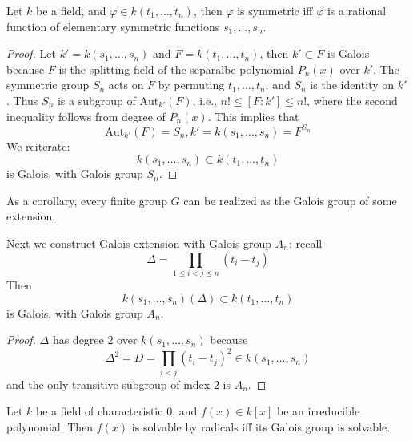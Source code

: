 \documentclass[openany]{book}
\newcommand{\aut}{\text{Aut}}
\begin{document}
\begin{prop}
    Let $k$ be a field, and $\varphi\in k(t_1,\dots,t_n)$, then $\varphi$ is symmetric iff $\varphi$ is a rational function of elementary symmetric functions $s_1,\dots, s_n$.
\end{prop}
\begin{proof}
    Let $k'=k(s_1,\dots, s_n)$ and $F=k(t_1,\dots, t_n)$, then $k'\subset F$ is Galois because $F$ is the splitting field of the separalbe polynomial $P_n(x)$ over $k'$. The symmetric group $S_n$ acts on $F$ by permuting $t_1,\dots, t_n$, and $S_n$ is the identity on $k'$. Thus $S_n$ is a subgroup of $\aut_{k'}(F)$, i.e., $n!\leq [F:k']\leq n!$, where the second inequality follows from degree of $P_n(x)$. This implies that 
    \begin{equation*}
        \aut_{k'}(F)=S_n, k'=k(s_1,\dots, s_n)=F^{S_n}
    \end{equation*}
    We reiterate: 
    \begin{equation*}
        k(s_1,\dots,s_n)\subset k(t_1,\dots,t_n)
    \end{equation*}
    is Galois, with Galois group $S_n$.
\end{proof}

\begin{prop}
    As a corollary, every finite group $G$ can be realized as the Galois group of some extension.
\end{prop}


\begin{prop}
    Next we construct Galois extension with Galois group $A_n$: recall 
    \begin{equation*}
        \Delta=\prod_{1\leq i<j\leq n}(t_i-t_j)
    \end{equation*}
    Then 
    \begin{equation*}
        k(s_1,\dots, s_n)(\Delta)\subset k(t_1,\dots, t_n)
    \end{equation*}
    is Galois, with Galois group $A_n$.
\end{prop}
\begin{proof}
    $\Delta$ has degree $2$ over $k(s_1,\dots,s_n)$ because 
    \begin{equation*}
        \Delta^2=D=\prod_{i<j}(t_i-t_j)^2\in k(s_1,\dots, s_n)
    \end{equation*}
    and the only transitive subgroup of index $2$ is $A_n$.
\end{proof}


\begin{prop}
    Let $k$ be a field of characteristic $0$, and $f(x)\in k[x]$ be an irreducible polynomial. Then $f(x)$ is solvable by radicals iff its Galois group is solvable.
\end{prop}
\end{document}
